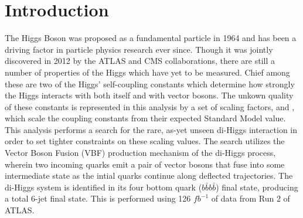 %

\chapter{Introduction}\label{chapter:introduction}

%

The Higgs Boson was proposed as a fundamental particle in 1964
    and has been a driving factor in particle physics research ever since.
Though it was jointly discovered in 2012 by the ATLAS and CMS collaborations,
    there are still a number of properties of the Higgs which have yet to be measured.
Chief among these are two of the Higgs' self-coupling constants
    which determine how strongly the Higgs interacts with both itself and with vector bosons.
The unkown quality of these constants is represented in this analysis by a set of scaling factors, \kl and \kvv,
    which scale the coupling constants from their expected Standard Model value.
This analysis performs a search for the rare,
    as-yet unseen di-Higgs interaction in order to set tighter constraints on these scaling values.
The search utilizes the Vector Boson Fusion (VBF) production mechanism of the di-Higgs process,
    wherein two incoming quarks emit a pair of vector bosons that fuse into some intermediate state
    as the intial quarks continue along deflected trajectories.
The di-Higgs system is identified in its four bottom quark ($b \bar b b \bar b$) final state,
    producing a total 6-jet final state.
This is performed using 126 $\textit{fb}^{-1}$ of data from Run 2 of ATLAS.

